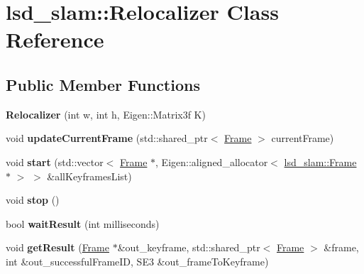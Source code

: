 \hypertarget{classlsd__slam_1_1_relocalizer}{\section{lsd\-\_\-slam\-:\-:Relocalizer Class Reference}
\label{classlsd__slam_1_1_relocalizer}
}
\subsection*{Public Member Functions}
\begin{DoxyCompactItemize}
\item 
\hypertarget{classlsd__slam_1_1_relocalizer_acd060c9dc0f2c1ae667f517a1f3e7947}{{\bfseries Relocalizer} (int w, int h, Eigen\-::\-Matrix3f K)}\label{classlsd__slam_1_1_relocalizer_acd060c9dc0f2c1ae667f517a1f3e7947}

\item 
\hypertarget{classlsd__slam_1_1_relocalizer_a55f025b2393347238dd7e039c04cd55f}{void {\bfseries update\-Current\-Frame} (std\-::shared\-\_\-ptr$<$ \hyperlink{classlsd__slam_1_1_frame}{Frame} $>$ current\-Frame)}\label{classlsd__slam_1_1_relocalizer_a55f025b2393347238dd7e039c04cd55f}

\item 
\hypertarget{classlsd__slam_1_1_relocalizer_ae4dd8af1a09287333b2f7a22ac5ef99d}{void {\bfseries start} (std\-::vector$<$ \hyperlink{classlsd__slam_1_1_frame}{Frame} $\ast$, Eigen\-::aligned\-\_\-allocator$<$ \hyperlink{classlsd__slam_1_1_frame}{lsd\-\_\-slam\-::\-Frame} $\ast$ $>$ $>$ \&all\-Keyframes\-List)}\label{classlsd__slam_1_1_relocalizer_ae4dd8af1a09287333b2f7a22ac5ef99d}

\item 
\hypertarget{classlsd__slam_1_1_relocalizer_a74488e97a8183f671a5e0b34d81e9b88}{void {\bfseries stop} ()}\label{classlsd__slam_1_1_relocalizer_a74488e97a8183f671a5e0b34d81e9b88}

\item 
\hypertarget{classlsd__slam_1_1_relocalizer_a3c06e60e0788f2203160d46825745492}{bool {\bfseries wait\-Result} (int milliseconds)}\label{classlsd__slam_1_1_relocalizer_a3c06e60e0788f2203160d46825745492}

\item 
\hypertarget{classlsd__slam_1_1_relocalizer_a2c50009413c4f6d2d8de3f9e8c9c7272}{void {\bfseries get\-Result} (\hyperlink{classlsd__slam_1_1_frame}{Frame} $\ast$\&out\-\_\-keyframe, std\-::shared\-\_\-ptr$<$ \hyperlink{classlsd__slam_1_1_frame}{Frame} $>$ \&frame, int \&out\-\_\-successful\-Frame\-I\-D, S\-E3 \&out\-\_\-frame\-To\-Keyframe)}\label{classlsd__slam_1_1_relocalizer_a2c50009413c4f6d2d8de3f9e8c9c7272}

\end{DoxyCompactItemize}
